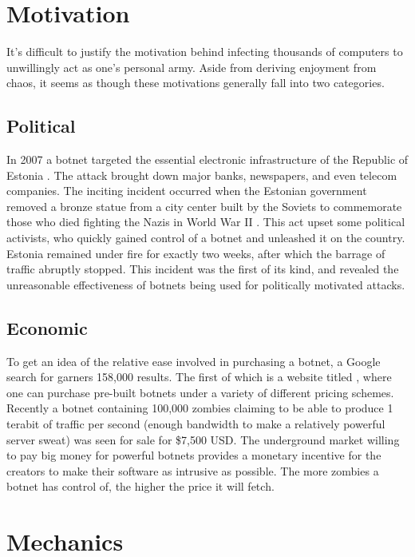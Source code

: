 \section{Motivation}
It's difficult to justify the motivation behind infecting thousands of computers to
unwillingly act as one's personal army. Aside from deriving enjoyment from chaos,
it seems as though these motivations generally fall into two categories.

\subsection{Political}
In 2007 a botnet targeted the essential electronic infrastructure of the Republic
of Estonia \cite{estonia}. The attack brought down major banks, newspapers, and
even telecom companies. The inciting incident occurred when the Estonian government
removed a bronze statue from a city center built by the Soviets to commemorate those who died fighting
the Nazis in World War II \cite{estonia}. This act upset some political activists, who quickly
gained control of a botnet and unleashed it on the country.  Estonia remained under
fire for exactly two weeks, after which the barrage of traffic abruptly stopped.
This incident was the first of its kind, and revealed the unreasonable effectiveness
of botnets being used for politically motivated attacks.

\subsection{Economic}
To get an idea of the relative ease involved in purchasing a botnet, a Google
search for  garners 158,000 results.
The first of which is a website titled ,
where one can purchase pre-built botnets under a variety of different pricing schemes.
Recently a botnet containing 100,000 zombies claiming to be able to produce
1 terabit of traffic per second (enough bandwidth to make a relatively powerful server sweat)
was seen for sale for \$7,500 USD\cite{forbessale}. The underground market willing
to pay big money for powerful botnets provides a monetary incentive for the creators to make
their software as intrusive as possible.  The more zombies a botnet has control
of, the higher the price it will fetch.

\section{Mechanics}


